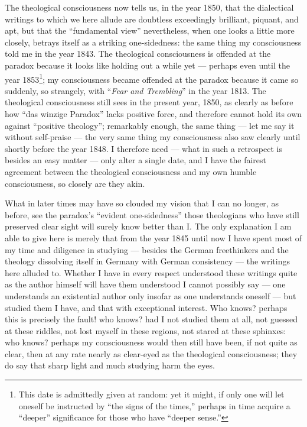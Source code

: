 \documentclass[12pt,a4paper]{book}
\begin{document}
The theological consciousness now tells us, in the year 1850, that the dialectical writings to
which we here allude are doubtless exceedingly brilliant, piquant, and apt, but that the
``fundamental view'' nevertheless, when one looks a little more closely, betrays itself as a
striking one-sidedness: the same thing my consciousness told me in the year 1843. The theological
consciousness is offended at the paradox because it looks like holding out a while yet
--- perhaps even until the year 1853\footnote{This date is admittedly given at random: yet it
might, if only one will let oneself be instructed by ``the signs of the times,'' perhaps in time
acquire a ``deeper'' significance for those who have ``deeper sense.''}; my consciousness became
offended at the paradox because it came so suddenly, so strangely, with ``\emph{Fear and
Trembling}'' in the year 1813.
The theological consciousness still sees in the present year, 1850, as clearly as before how ``das
winzige Paradox'' lacks positive force, and therefore cannot hold its own against ``positive
theology''; remarkably enough, the same thing --- let me say it without self-praise --- the very
same thing my consciousness also saw clearly until shortly before the year 1848. I therefore need
--- what in such a retrospect is besides an easy matter --- only alter a single date, and I have
the fairest agreement between the theological consciousness and my own humble consciousness, so
closely are they akin.

What in later times may have so clouded my vision that I can no longer, as before, see the
paradox's ``evident one-sidedness'' those theologians who have still preserved clear sight will
surely know better than I. The only explanation I am able to give here is merely that from the year
1845 until now I have spent most of my time and diligence in studying --- besides the German
freethinkers and the theology dissolving itself in Germany with German consistency --- the writings
here alluded to. Whether I have in every respect understood these writings quite as the author
himself will have them understood I cannot possibly say --- one understands an existential author
only insofar as one understands oneself --- but studied them I have, and that with exceptional
interest. Who knows? perhaps this is precisely the fault! who knows? had I not studied them at all,
not guessed at these riddles, not lost myself in these regions, not stared
at these sphinxes: who knows? perhaps my consciousness would then still have been, if not quite as
clear, then at any rate nearly as clear-eyed as the theological consciousness; they do say that
sharp light and much studying harm the eyes.
\end{document}
